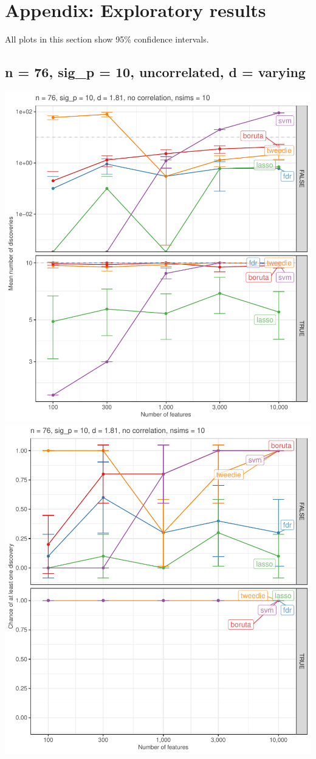 \documentclass[
]{article}
\begin{document}
\newpage

\hypertarget{appendix-appendix}{%
\appendix}


\hypertarget{exploratory}{%
\section{Appendix: Exploratory results}\label{exploratory}}

All plots in this section show 95\% confidence intervals.

\hypertarget{n-76-sig_p-10-uncorrelated-d-varying}{%
\subsection{n = 76, sig\_p = 10, uncorrelated, d = varying}\label{n-76-sig_p-10-uncorrelated-d-varying}}

\begin{center}\includegraphics[width=0.49\linewidth]{main_files/figure-latex/unnamed-chunk-7-1} \includegraphics[width=0.49\linewidth]{main_files/figure-latex/unnamed-chunk-7-2} \end{center}
\end{document}
